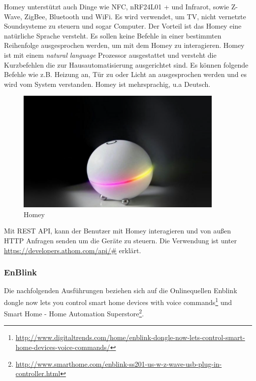 \noindent
Homey unterstützt auch Dinge wie NFC, nRF24L01 + und Infrarot, sowie Z-Wave, ZigBee,
Bluetooth und WiFi. Es wird verwendet, um TV, nicht vernetzte Soundsysteme zu steuern und sogar
Computer. Der Vorteil ist das Homey eine natürliche Sprache versteht. Es sollen keine Befehle in einer bestimmten Reihenfolge ausgesprochen werden, um mit dem Homey zu interagieren. Homey ist mit einem \textit{natural language} Prozessor ausgestattet und versteht die Kurzbefehlen die zur Hausautomatisierung ausgerichtet sind. Es können folgende Befehle wie z.B. \glqq Heizung an\grqq , \glqq Tür zu\grqq{} oder \glqq Licht an\grqq{} ausgesprochen werden und es wird vom System verstanden. Homey ist mehrsprachig, u.a Deutsch.

\begin{figure}[h!]
	\centering
	\includegraphics[width=0.9\textwidth]{img/Feedback-Mechanismen/Homey.png}
	\caption{Homey}
	\label{fig:feedbackHomey}
\end{figure}

Mit REST API, kann der Benutzer mit Homey interagieren und von außen HTTP Anfragen senden
um die Geräte zu steuern. Die Verwendung ist unter \url{https://developers.athom.com/api/#} erklärt.

\subsubsection{EnBlink}
Die nachfolgenden Ausführungen beziehen sich auf die Onlinequellen \glqq Enblink dongle now lets you control smart home devices with voice commands\grqq\footnote{\url{http://www.digitaltrends.com/home/enblink-dongle-now-lets-control-smart-home-devices-voice-commands/}} und \glqq Smart Home - Home Automation Superstore\grqq\footnote{\url{http://www.smarthome.com/enblink-ss201-us-w-z-wave-usb-plug-in-controller.html}}.

